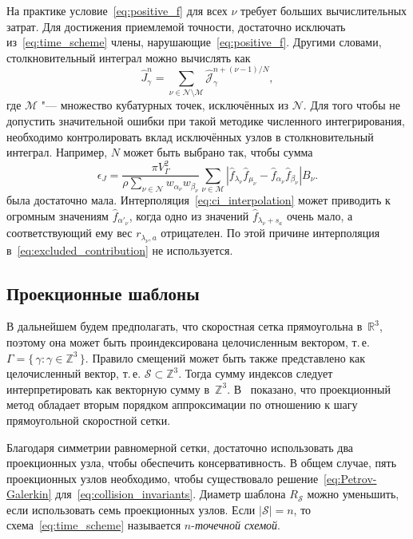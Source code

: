 \documentclass[
aps,%
12pt,%
final,%
notitlepage,%
oneside,%
onecolumn,%
nobibnotes,%
nofootinbib,%
superscriptaddress,%
noshowpacs,%
showkeys,%
floatfix,%
tightenlines,%
centertags]%
{revtex4}
\newcommand{\Nu}{\mathcal{N}}
\newcommand{\Mu}{\mathcal{M}}
\newcommand{\Set}[2]{\{\,{#1}:{#2}\,\}}
\begin{document}
На практике условие~\eqref{eq:positive_f} для всех \(\nu\) требует больших вычислительных затрат.
Для достижения приемлемой точности, достаточно исключать из~\eqref{eq:time_scheme} члены,
нарушающие~\eqref{eq:positive_f}. Другими словами, столкновительный интеграл можно вычислять как
\begin{equation}\label{eq:discrete_short_ci_discarded}
    \hat{J}_\gamma^n = \sum_{\nu\in\Nu\setminus\Mu} \hat{\mathscr{J}}_\gamma^{n+(\nu-1)/N},
\end{equation}
где \(\Mu\) "--- множество кубатурных точек, исключённых из \(\Nu\).
Для того чтобы не допустить значительной ошибки при такой методике численного интегрирования,
необходимо контролировать вклад исключённых узлов в столкновительный интеграл.
Например, \(N\) может быть выбрано так, чтобы сумма
\begin{equation}\label{eq:excluded_contribution}
    \epsilon_J = \frac{\pi V_\Gamma^2}{\rho\sum_{\nu\in\Nu} w_{\alpha_\nu}w_{\beta_\nu}}
        \sum_{\nu\in\Mu} \left|
            \hat{f}_{\lambda_\nu}\hat{f}_{\mu_\nu} - \hat{f}_{\alpha_\nu}\hat{f}_{\beta_\nu}
        \right|B_\nu.
\end{equation}
была достаточно мала.
Интерполяция~\eqref{eq:ci_interpolation} может приводить к огромным значениям \(\hat{f}_{\alpha'_\nu}\),
когда одно из значений \(\hat{f}_{\lambda_\nu+s_a}\) очень мало,
а соответствующий ему вес \(r_{\lambda_\nu,a}\) отрицателен.
По этой причине интерполяция в~\eqref{eq:excluded_contribution} не используется.

\subsection{Проекционные шаблоны}

В дальнейшем будем предполагать, что скоростная сетка прямоугольна в~\(\mathbb{R}^3\),
поэтому она может быть проиндексирована целочисленным вектором, т.\,е. \(\Gamma = \Set{\gamma}{\gamma\in\mathbb{Z}^3}\).
Правило смещений может быть также представлено как целочисленный вектор, т.\,е. \(\mathcal{S}\subset\mathbb{Z}^3\).
Тогда сумму индексов следует интерпретировать как векторную сумму в~\(\mathbb{Z}^3\).
В~\cite{Anikin2012} показано, что проекционный метод обладает вторым порядком аппроксимации
по отношению к шагу прямоугольной скоростной сетки.

Благодаря симметрии равномерной сетки,
достаточно использовать два проекционных узла, чтобы обеспечить консервативность.
В общем случае, пять проекционных узлов необходимо,
чтобы существовало решение~\eqref{eq:Petrov-Galerkin} для~\eqref{eq:collision_invariants}.
Диаметр шаблона \(R_\mathcal{S}\) можно уменьшить, если использовать семь проекционных узлов.
Если \(|\mathcal{S}|=n\), то схема~\eqref{eq:time_scheme} называется \(n\)-\emph{точечной схемой}.
\end{document}

